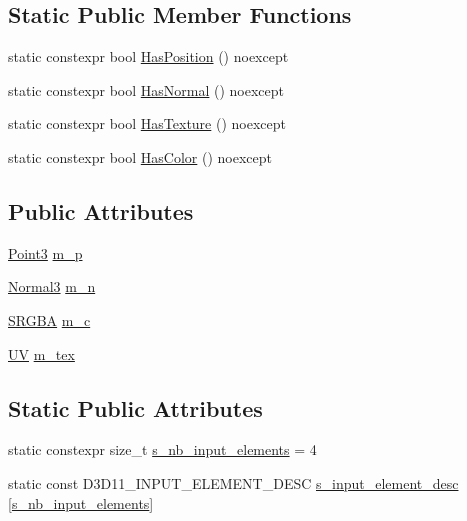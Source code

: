 \subsection*{Static Public Member Functions}
\begin{DoxyCompactItemize}
\item 
static constexpr bool \hyperlink{structmage_1_1_vertex_position_normal_color_texture_a493fdcc26dfbee8025da34f2d2600b1f}{Has\+Position} () noexcept
\item 
static constexpr bool \hyperlink{structmage_1_1_vertex_position_normal_color_texture_af1b565b25fd4beb2cff66931cc32de86}{Has\+Normal} () noexcept
\item 
static constexpr bool \hyperlink{structmage_1_1_vertex_position_normal_color_texture_a27f5a115642f443419683417360fd58e}{Has\+Texture} () noexcept
\item 
static constexpr bool \hyperlink{structmage_1_1_vertex_position_normal_color_texture_aee56f3577ac93b0f57084ab76ec45abd}{Has\+Color} () noexcept
\end{DoxyCompactItemize}
\subsection*{Public Attributes}
\begin{DoxyCompactItemize}
\item 
\hyperlink{structmage_1_1_point3}{Point3} \hyperlink{structmage_1_1_vertex_position_normal_color_texture_aa89d2cda6de313b7543c71cb3810b38b}{m\+\_\+p}
\item 
\hyperlink{structmage_1_1_normal3}{Normal3} \hyperlink{structmage_1_1_vertex_position_normal_color_texture_a2ee881cac4d5676cd3806e346231a280}{m\+\_\+n}
\item 
\hyperlink{structmage_1_1_s_r_g_b_a}{S\+R\+G\+BA} \hyperlink{structmage_1_1_vertex_position_normal_color_texture_a241873e111ffd017acc2a248bd72c1c6}{m\+\_\+c}
\item 
\hyperlink{structmage_1_1_u_v}{UV} \hyperlink{structmage_1_1_vertex_position_normal_color_texture_a2f056a448a366f5eb5977f33f1309282}{m\+\_\+tex}
\end{DoxyCompactItemize}
\subsection*{Static Public Attributes}
\begin{DoxyCompactItemize}
\item 
static constexpr size\+\_\+t \hyperlink{structmage_1_1_vertex_position_normal_color_texture_aec9480e361ddffcbcb29cd58a0c33aff}{s\+\_\+nb\+\_\+input\+\_\+elements} = 4
\item 
static const D3\+D11\+\_\+\+I\+N\+P\+U\+T\+\_\+\+E\+L\+E\+M\+E\+N\+T\+\_\+\+D\+E\+SC \hyperlink{structmage_1_1_vertex_position_normal_color_texture_a95286a5de390f414f036371f4ad08de1}{s\+\_\+input\+\_\+element\+\_\+desc} \mbox{[}\hyperlink{structmage_1_1_vertex_position_normal_color_texture_aec9480e361ddffcbcb29cd58a0c33aff}{s\+\_\+nb\+\_\+input\+\_\+elements}\mbox{]}
\end{DoxyCompactItemize}


